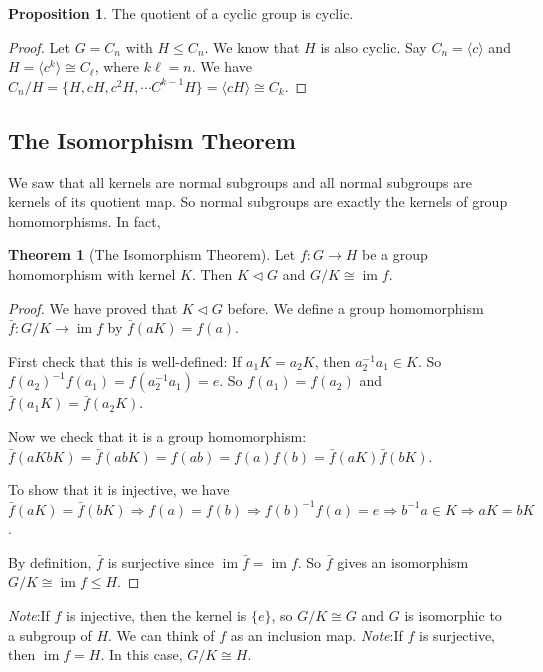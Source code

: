\documentclass[a4paper]{article}
\theoremstyle{definition}
\newtheorem*{prop}{Proposition}
\newtheorem*{thm}{Theorem}
\newcommand{\note}{\noindent \emph{Note}:\;}
\newcommand{\bra}{\langle}
\newcommand{\ket}{\rangle}
\DeclareMathOperator\im{im}
\begin{document}
\begin{prop}
  The quotient of a cyclic group is cyclic.
\end{prop}

\begin{proof}
  Let $G = C_n$ with $H\leq C_n$. We know that $H$ is also cyclic. Say $C_n = \bra c\ket$ and $H = \bra c^k \ket \cong C_\ell$, where $k\ell = n$. We have $C_n/H = \{H, cH, c^2H, \cdots C^{k - 1}H\}=\bra cH\ket \cong C_k$.
\end{proof}

\subsection{The Isomorphism Theorem}
We saw that all kernels are normal subgroups and all normal subgroups are kernels of its quotient map. So normal subgroups are exactly the kernels of group homomorphisms. In fact,
\begin{thm}[The Isomorphism Theorem]
  Let $f:G\to H$ be a group homomorphism with kernel $K$. Then $K\lhd G$ and $G/K\cong \im f$.
\end{thm}

\begin{proof}
  We have proved that $K\lhd G$ before. We define a group homomorphism $\bar f: G/K\to \im f$ by $\bar f(aK) = f(a)$.

First check that this is well-defined: If $a_1K = a_2K$, then $a_2^{-1}a_1\in K$. So $f(a_2)^{-1}f(a_1) = f(a_2^{-1}a_1) = e$. So $f(a_1) = f(a_2)$ and $\bar f(a_1K) = \bar f(a_2 K)$.

Now we check that it is a group homomorphism: $\bar f(aKbK) = \bar f(abK) = f(ab) = f(a)f(b) = \bar f(aK) \bar f(bK)$.

To show that it is injective, we have $\bar f(aK) = \bar f(bK) \Rightarrow f(a) = f(b) \Rightarrow f(b)^{-1}f(a)=e\Rightarrow b^{-1}a\in K \Rightarrow aK = bK$.

By definition, $\bar f$ is surjective since $\im \bar f = \im f$. So $\bar f$ gives an isomorphism $G/K \cong \im f \leq H$.
\end{proof}
\note If $f$ is injective, then the kernel is $\{e\}$, so $G/K\cong G$ and $G$ is isomorphic to a subgroup of $H$. We can think of $f$ as an inclusion map.
\note If $f$ is surjective, then $\im f = H$. In this case, $G/K \cong H$.
\end{document}
